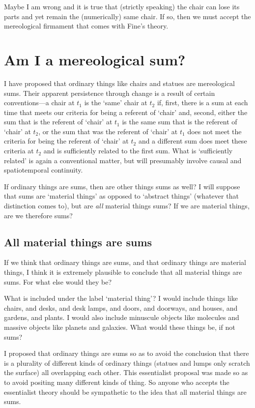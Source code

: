 \documentclass[11pt]{article}
\begin{document}
\begin{spacing}{1.5}
Maybe I am wrong and it is true that (strictly speaking) the chair can
lose its parts and yet remain the (numerically) same chair.  If so,
then we must accept the mereological firmament that comes with Fine's
theory.

\section{Am I a mereological sum?}
\label{i-sum}
I have proposed that ordinary things like chairs and statues are
mereological sums.  Their apparent persistence through change is a
result of certain conventions---a chair at $t_1$ is the `same' chair
at $t_2$ if, first, there is a sum at each time that meets our
criteria for being a referent of `chair' and, second, either the sum
that is the referent of `chair' at $t_1$ is the same sum that is the
referent of `chair' at $t_2$, or the sum that was the referent of
`chair' at $t_1$ does not meet the criteria for being the referent
of `chair' at $t_2$ and a different sum does meet these criteria at
$t_2$ and is sufficiently related to the first sum.  What is
`sufficiently related' is again a conventional matter, but will
presumably involve causal and spatiotemporal continuity.

If ordinary things are sums, then are other things sums as well?  I
will suppose that sums are `material things' as opposed to `abstract
things' (whatever that distinction comes to), but are {\em all}
material things sums?  If we are material things, are we therefore
sums?


\subsection{All material things are sums}
\label{material-sum}
If we think that ordinary things are sums, and that ordinary things
are material things, I think it is extremely plausible to conclude
that all material things are sums.  For what else would they be?

What is included under the label `material thing'?  I would include
things like chairs, and desks, and desk lamps, and doors, and
doorways, and houses, and gardens, and plants.  I would also include
minuscule objects like molecules and massive objects like planets and
galaxies.  What would these things be, if not sums?

I proposed that ordinary things are sums so as to avoid the conclusion
that there is a plurality of different kinds of ordinary things
(statues and lumps only scratch the surface) all overlapping each
other.  This essentialist proposal was made so as to avoid positing
many different kinds of thing.  So anyone who accepts the essentialist
theory should be sympathetic to the idea that all material things are
sums.


\end{spacing}
\end{document}
